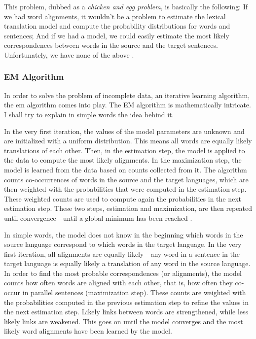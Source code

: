 This problem, dubbed as a \emph{chicken and egg problem}, is basically the following: If we had word alignments, it wouldn't be a problem to estimate the lexical translation model and compute the probability distributions for words and sentences; 
And if we had a model, we could easily estimate the most likely correspondences between words in the source and the target sentences. 
Unfortunately, we have none of the above \autocite[88]{koehn2009}.


\subsubsection{EM Algorithm} 
In order to solve the problem of incomplete data, an iterative learning algorithm, the \acrfull{em} algorithm comes into play. 
The EM algorithm is mathematically intricate. 
I shall try to explain in simple words the idea behind it. 

In the very first iteration, the values of the model parameters are unknown and are initialized with a uniform distribution. 
This means all words are equally likely  translations of each other.
Then, in the estimation step, the model is applied to the data to compute the most likely alignments. 
In the maximization step, the model is learned from the data based on counts collected from it. 
The algorithm counts co-occurrences of words in the source and the target languages, which are then weighted with the probabilities that were computed in the estimation step.
These weighted counts are used to compute again the probabilities in the next estimation step. 
These two steps, estimation and maximization, are then repeated until convergence---until a global minimum has been reached \autocites[88-92]{koehn2009}{brown-etal-1993-mathematics}.

In simple words, the model does not know in the beginning which words in the source language correspond to which words in the target language. 
In the very first iteration, all alignments are equally likely---any word in a sentence in the target language is equally likely a translation of any word in the source language.
In order to find the most probable correspondences (or alignments), the model counts how often words are aligned with each other, that is, how often they co-occur in parallel sentences (maximization step). 
These counts are weighted with the probabilities computed in the previous estimation step to refine the values in the next estimation step. 
Likely links between words are strengthened, while less likely links are weakened. 
This goes on until the model converges and the most likely word alignments have been learned by the model. 

